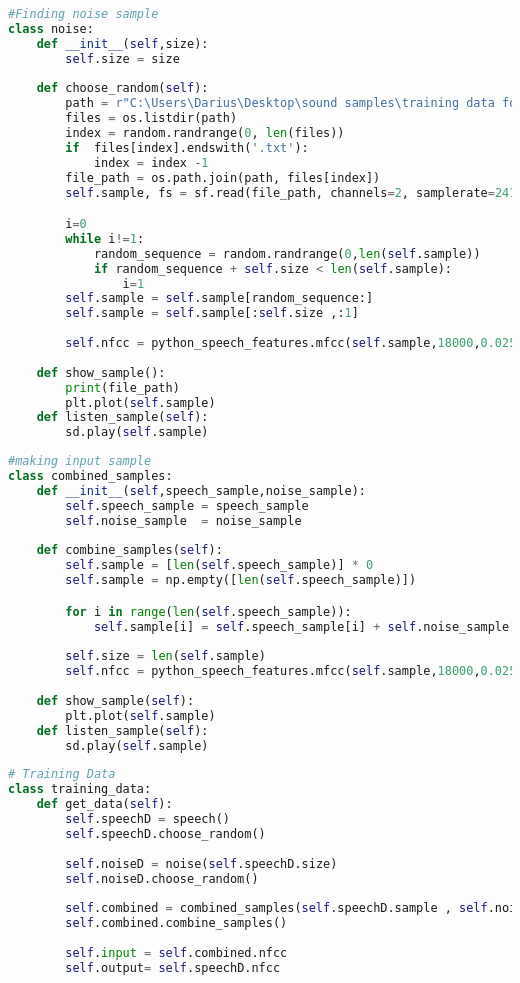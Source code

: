 \begin{lstlisting}[language=Python, label=lst:noisesample]
#Finding noise sample
class noise:
    def __init__(self,size):
        self.size = size
    
    def choose_random(self):
        path = r"C:\Users\Darius\Desktop\sound samples\training data for RNN\rnnoise_contributions"
        files = os.listdir(path)
        index = random.randrange(0, len(files))
        if  files[index].endswith('.txt'):
            index = index -1
        file_path = os.path.join(path, files[index])
        self.sample, fs = sf.read(file_path, channels=2, samplerate=24100,format='RAW', subtype='PCM_16')

        i=0
        while i!=1:
            random_sequence = random.randrange(0,len(self.sample))
            if random_sequence + self.size < len(self.sample):
                i=1
        self.sample = self.sample[random_sequence:]
        self.sample = self.sample[:self.size ,:1]
        
        self.nfcc = python_speech_features.mfcc(self.sample,18000,0.025,0.01,24)
        
    def show_sample():
        print(file_path)
        plt.plot(self.sample)
    def listen_sample(self):
        sd.play(self.sample) 
\end{lstlisting}

\begin{lstlisting}[language=Python, label=lst:imputsample]
#making input sample 
class combined_samples:
    def __init__(self,speech_sample,noise_sample):
        self.speech_sample = speech_sample
        self.noise_sample  = noise_sample
    
    def combine_samples(self):
        self.sample = [len(self.speech_sample)] * 0
        self.sample = np.empty([len(self.speech_sample)])

        for i in range(len(self.speech_sample)):
            self.sample[i] = self.speech_sample[i] + self.noise_sample[i]
        
        self.size = len(self.sample)
        self.nfcc = python_speech_features.mfcc(self.sample,18000,0.025,0.01,24)
        
    def show_sample(self):
        plt.plot(self.sample)
    def listen_sample(self):
        sd.play(self.sample) 
\end{lstlisting}

\begin{lstlisting}[language=Python, label=lst:trainingdata]
# Training Data
class training_data:
    def get_data(self):
        self.speechD = speech()
        self.speechD.choose_random()
        
        self.noiseD = noise(self.speechD.size)
        self.noiseD.choose_random()
        
        self.combined = combined_samples(self.speechD.sample , self.noiseD.sample)
        self.combined.combine_samples()
        
        self.input = self.combined.nfcc
        self.output= self.speechD.nfcc
\end{lstlisting}

